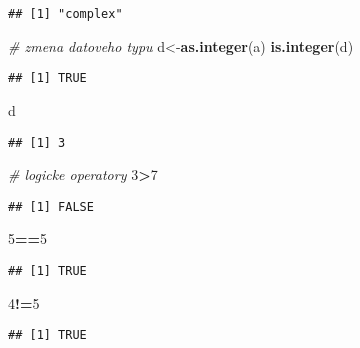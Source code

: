 \documentclass[
]{article}
\newenvironment{Shaded}{\begin{snugshade}}{\end{snugshade}}
\newcommand{\CommentTok}[1]{\textcolor[rgb]{0.56,0.35,0.01}{\textit{#1}}}
\newcommand{\DecValTok}[1]{\textcolor[rgb]{0.00,0.00,0.81}{#1}}
\newcommand{\FunctionTok}[1]{\textcolor[rgb]{0.13,0.29,0.53}{\textbf{#1}}}
\newcommand{\NormalTok}[1]{#1}
\newcommand{\OtherTok}[1]{\textcolor[rgb]{0.56,0.35,0.01}{#1}}
\newcommand{\SpecialCharTok}[1]{\textcolor[rgb]{0.81,0.36,0.00}{\textbf{#1}}}
\begin{document}
\begin{verbatim}
## [1] "complex"
\end{verbatim}

\begin{Shaded}
\begin{Highlighting}[]
\CommentTok{\# zmena datoveho typu}
\NormalTok{d}\OtherTok{\textless{}{-}}\FunctionTok{as.integer}\NormalTok{(a)}
\FunctionTok{is.integer}\NormalTok{(d)}
\end{Highlighting}
\end{Shaded}

\begin{verbatim}
## [1] TRUE
\end{verbatim}

\begin{Shaded}
\begin{Highlighting}[]
\NormalTok{d}
\end{Highlighting}
\end{Shaded}

\begin{verbatim}
## [1] 3
\end{verbatim}

\begin{Shaded}
\begin{Highlighting}[]
\CommentTok{\# logicke operatory}
\DecValTok{3}\SpecialCharTok{\textgreater{}}\DecValTok{7}
\end{Highlighting}
\end{Shaded}

\begin{verbatim}
## [1] FALSE
\end{verbatim}

\begin{Shaded}
\begin{Highlighting}[]
\DecValTok{5}\SpecialCharTok{==}\DecValTok{5}
\end{Highlighting}
\end{Shaded}

\begin{verbatim}
## [1] TRUE
\end{verbatim}

\begin{Shaded}
\begin{Highlighting}[]
\DecValTok{4}\SpecialCharTok{!=}\DecValTok{5}
\end{Highlighting}
\end{Shaded}

\begin{verbatim}
## [1] TRUE
\end{verbatim}
\end{document}
